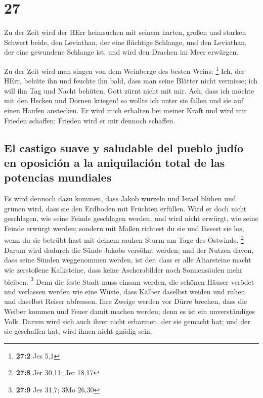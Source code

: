 \hypertarget{section-26}{%
\section{27}\label{section-26}}

 Zu der Zeit wird der HErr heimsuchen mit seinem harten,
großen und starken Schwert beide, den Leviathan, der eine flüchtige
Schlange, und den Leviathan, der eine gewundene Schlange ist, und wird
den Drachen im Meer erwürgen.

 Zu der Zeit wird man singen von dem Weinberge des besten
Weins: \footnote{\textbf{27:2} Jes 5,1}  Ich, der HErr,
behüte ihn und feuchte ihn bald, dass man seine Blätter nicht vermisse;
ich will ihn Tag und Nacht behüten.  Gott zürnt nicht mit
mir. Ach, dass ich möchte mit den Hecken und Dornen kriegen! so wollte
ich unter sie fallen und sie auf einen Haufen anstecken. 
Er wird mich erhalten bei meiner Kraft und wird mir Frieden schaffen;
Frieden wird er mir dennoch schaffen.

\hypertarget{el-castigo-suave-y-saludable-del-pueblo-juduxedo-en-oposiciuxf3n-a-la-aniquilaciuxf3n-total-de-las-potencias-mundiales}{%
\subsection{El castigo suave y saludable del pueblo judío en oposición a
la aniquilación total de las potencias
mundiales}\label{el-castigo-suave-y-saludable-del-pueblo-juduxedo-en-oposiciuxf3n-a-la-aniquilaciuxf3n-total-de-las-potencias-mundiales}}

 Es wird dennoch dazu kommen, dass Jakob wurzeln und
Israel blühen und grünen wird, dass sie den Erdboden mit Früchten
erfüllen.  Wird er doch nicht geschlagen, wie seine Feinde
geschlagen werden, und wird nicht erwürgt, wie seine Feinde erwürgt
werden;  sondern mit Maßen richtest du sie und lässest sie
los, wenn du sie betrübt hast mit deinem rauhen Sturm am Tage des
Ostwinds. \footnote{\textbf{27:8} Jer 30,11; Jer 18,17} 
Darum wird dadurch die Sünde Jakobs versöhnt werden; und der Nutzen
davon, dass seine Sünden weggenommen werden, ist der, dass er alle
Altarsteine macht wie zerstoßene Kalksteine, dass keine Ascherabilder
noch Sonnensäulen mehr bleiben. \footnote{\textbf{27:9} Jes 31,7; 3Mo
  26,30}  Denn die feste Stadt muss einsam werden, die
schönen Häuser verödet und verlassen werden wie eine Wüste, dass Kälber
daselbst weiden und ruhen und daselbst Reiser abfressen. 
Ihre Zweige werden vor Dürre brechen, dass die Weiber kommen und Feuer
damit machen werden; denn es ist ein unverständiges Volk. Darum wird
sich auch ihrer nicht erbarmen, der sie gemacht hat; und der sie
geschaffen hat, wird ihnen nicht gnädig sein.

